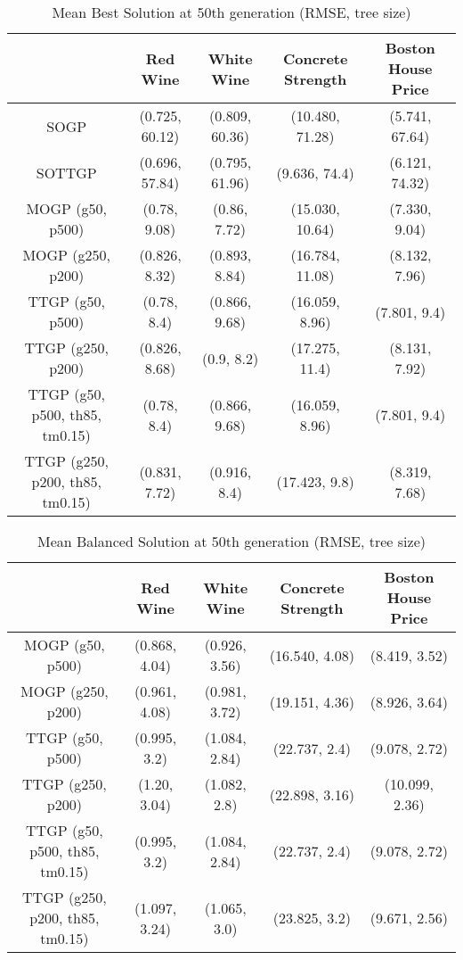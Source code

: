 \documentclass[a4paper, twocolumn]{article}
\begin{document}
\begin{table*}[t]
	\begin{center}
		\caption{Mean Best Solution at 50th generation (RMSE, tree size)}
		\label{table:1}
		\begin{tabular}{ c|cccc }
			& Red Wine & White Wine & Concrete Strength & Boston House Price\\
			\hline
			SOGP &(0.725, 60.12)&(0.809, 60.36)&(10.480, 71.28)&(5.741, 67.64)\\
			SOTTGP &(0.696, 57.84)&(0.795, 61.96)&(9.636, 74.4)&(6.121, 74.32)\\
			MOGP (g50, p500) &(0.78, 9.08)&(0.86, 7.72)&(15.030, 10.64)&(7.330, 9.04)\\
			MOGP (g250, p200) &(0.826, 8.32)&(0.893, 8.84)&(16.784, 11.08)&(8.132, 7.96)\\
			TTGP (g50, p500) &(0.78, 8.4)&(0.866, 9.68)&(16.059, 8.96)&(7.801, 9.4)\\
			TTGP (g250, p200) &(0.826, 8.68)&(0.9, 8.2)&(17.275, 11.4)&(8.131, 7.92)\\
			TTGP (g50, p500, th85, tm0.15) &(0.78, 8.4)&(0.866, 9.68)&(16.059, 8.96)&(7.801, 9.4)\\
			TTGP (g250, p200, th85, tm0.15) &(0.831, 7.72)&(0.916, 8.4)&(17.423, 9.8)&(8.319, 7.68)\\
		\end{tabular}
	\end{center}
\end{table*}
\begin{table*}[t]
	\begin{center}
		\caption{Mean Balanced Solution at 50th generation (RMSE, tree size)}
		\label{table:3}
		\begin{tabular}{ c|cccc }
			& Red Wine & White Wine & Concrete Strength & Boston House Price\\
			\hline
			MOGP (g50, p500) &(0.868, 4.04)&(0.926, 3.56)&(16.540, 4.08)&(8.419, 3.52)\\
			MOGP (g250, p200) &(0.961, 4.08)&(0.981, 3.72)&(19.151, 4.36)&(8.926, 3.64)\\
			TTGP (g50, p500) &(0.995, 3.2)&(1.084, 2.84)&(22.737, 2.4)&(9.078, 2.72)\\
			TTGP (g250, p200) &(1.20, 3.04)&(1.082, 2.8)&(22.898, 3.16)&(10.099, 2.36)\\
			TTGP (g50, p500, th85, tm0.15) &(0.995, 3.2)&(1.084, 2.84)&(22.737, 2.4)&(9.078, 2.72)\\
			TTGP (g250, p200, th85, tm0.15) &(1.097, 3.24)&(1.065, 3.0)&(23.825, 3.2)&(9.671, 2.56)\\
		\end{tabular}
	\end{center}
\end{table*}
\end{document}
